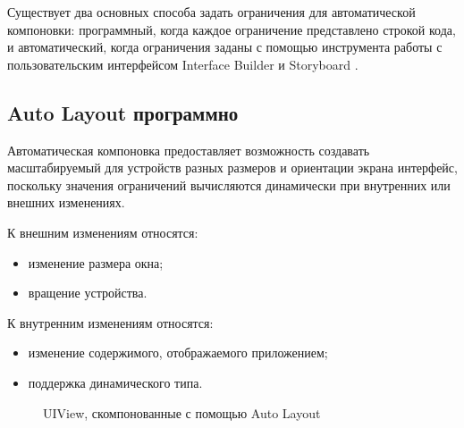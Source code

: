 Существует два основных способа задать ограничения для автоматической компоновки: программный, когда каждое ограничение представлено строкой кода, и автоматический, когда ограничения заданы с помощью инструмента работы с пользовательским интерфейсом Interface Builder и Storyboard \cite{storyboard}.

\subsection{Auto Layout программно}

Автоматическая компоновка предоставляет возможность создавать масштабируемый для устройств разных размеров и ориентации экрана интерфейс, поскольку значения ограничений вычисляются динамически при внутренних или внешних изменениях. 

К внешним изменениям относятся:
\begin{itemize}
	\item изменение размера окна;
	\item вращение устройства.
\end{itemize}

К внутренним изменениям относятся:
\begin{itemize}
	\item изменение содержимого, отображаемого приложением;
	\item поддержка динамического типа.
\end{itemize}


\begin{figure}[h!]
	\caption{UIView, скомпонованные с помощью Auto Layout}
	\label{fig:autolayout}
\end{figure}

